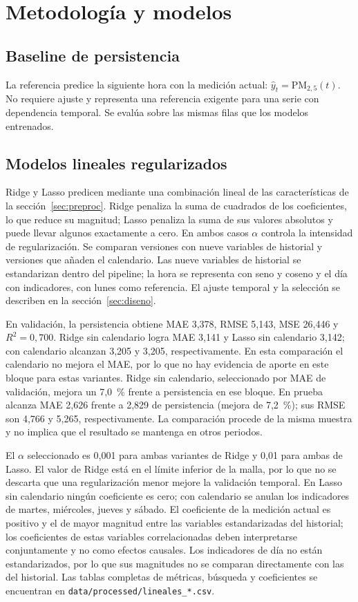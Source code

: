 \section{Metodología y modelos}
\label{sec:metodologia}
\subsection{Baseline de persistencia}
La referencia predice la siguiente hora con la medición actual: $\hat y_t=\mathrm{PM}_{2{,}5}(t)$. No requiere ajuste y representa una referencia exigente para una serie con dependencia temporal. Se evalúa sobre las mismas filas que los modelos entrenados.

\subsection{Modelos lineales regularizados}
Ridge y Lasso predicen mediante una combinación lineal de las características de la sección~\ref{sec:preproc}. Ridge penaliza la suma de cuadrados de los coeficientes, lo que reduce su magnitud; Lasso penaliza la suma de sus valores absolutos y puede llevar algunos exactamente a cero. En ambos casos $\alpha$ controla la intensidad de regularización. Se comparan versiones con nueve variables de historial y versiones que añaden el calendario. Las nueve variables de historial se estandarizan dentro del pipeline; la hora se representa con seno y coseno y el día con indicadores, con lunes como referencia. El ajuste temporal y la selección se describen en la sección~\ref{sec:diseno}.

En validación, la persistencia obtiene MAE 3,378, RMSE 5,143, MSE 26,446 y $R^2=0{,}700$. Ridge sin calendario logra MAE 3,141 y Lasso sin calendario 3,142; con calendario alcanzan 3,205 y 3,205, respectivamente. En esta comparación el calendario no mejora el MAE, por lo que no hay evidencia de aporte en este bloque para estas variantes. Ridge sin calendario, seleccionado por MAE de validación, mejora un 7,0~\% frente a persistencia en ese bloque. En prueba alcanza MAE 2,626 frente a 2,829 de persistencia (mejora de 7,2~\%); sus RMSE son 4,766 y 5,265, respectivamente. La comparación procede de la misma muestra y no implica que el resultado se mantenga en otros periodos.

El $\alpha$ seleccionado es 0,001 para ambas variantes de Ridge y 0,01 para ambas de Lasso. El valor de Ridge está en el límite inferior de la malla, por lo que no se descarta que una regularización menor mejore la validación temporal. En Lasso sin calendario ningún coeficiente es cero; con calendario se anulan los indicadores de martes, miércoles, jueves y sábado. El coeficiente de la medición actual es positivo y el de mayor magnitud entre las variables estandarizadas del historial; los coeficientes de estas variables correlacionadas deben interpretarse conjuntamente y no como efectos causales. Los indicadores de día no están estandarizados, por lo que sus magnitudes no se comparan directamente con las del historial. Las tablas completas de métricas, búsqueda y coeficientes se encuentran en \texttt{data/processed/lineales\_*.csv}.
